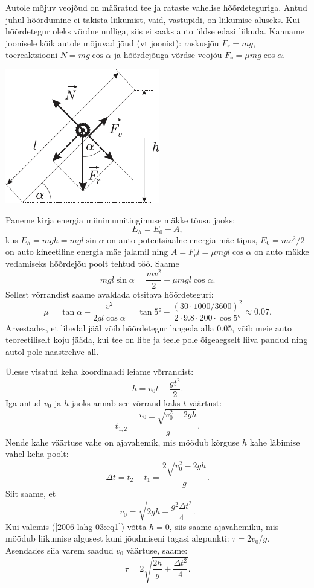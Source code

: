 \documentclass[10pt]{article}
\begin{document}
{%

\solu
Autole mõjuv veojõud on määratud tee ja rataste vahelise hõõrdeteguriga. Antud juhul hõõrdumine ei takista liikumist, vaid, vastupidi, on liikumise aluseks. Kui hõõrdetegur oleks võrdne nulliga, siis ei saaks auto üldse edasi liikuda. Kanname joonisele kõik autole mõjuvad jõud (vt joonist): raskusjõu $F_r = mg$, toereaktsiooni $N = mg \cos \alpha$ ja hõõrdejõuga võrdse veojõu $F_v = \mu mg \cos \alpha$.

\begin{center}
	\includegraphics[width=0.5\linewidth]{2005-lahg-02-lah}
\end{center}

Paneme kirja energia miinimumitingimuse mäkke tõusu jaoks:
\[
E_h = E_0 + A,
\]
kus $E_h = mgh = mgl\sin \alpha$ on auto potentsiaalne energia mäe tipus, $E_0 = mv^2/2$ on auto kineetiline energia mäe jalamil ning $A = F_vl = \mu mgl \cos \alpha$ on auto mäkke vedamiseks hõõrdejõu poolt tehtud töö. Saame
\[
m g l \sin \alpha=\frac{m v^{2}}{2}+\mu m g l \cos \alpha.
\]
Sellest võrrandist saame avaldada otsitava hõõrdeteguri:
\[
\mu=\tan \alpha-\frac{v^{2}}{2 g l \cos \alpha}=\tan \ang{5}-\frac{(\num{30} \cdot \num{1000} / \num{3600})^{2}}{\num{2} \cdot \num{9,8} \cdot \num{200} \cdot \cos \ang{5}} \approx \num{0,07}.
\]
Arvestades, et libedal jääl võib hõõrdetegur langeda alla \num{0,05}, võib meie auto teoreetiliselt koju jääda, kui tee on libe ja teele pole õigeaegselt liiva pandud ning autol pole naastrehve all.
\probend
\bigskip


\solu
Ülesse visatud keha koordinaadi leiame võrrandist: 
\[
h = v_0t - \frac{gt^2}{2}.
\]
Iga antud $v_0$ ja $h$ jaoks annab see võrrand kaks $t$ väärtust:
\[
t_{1,2}=\frac{v_{0} \pm \sqrt{v_{0}^{2}-2 g h}}{g}.
\]
Nende kahe väärtuse vahe on ajavahemik, mis möödub kõrguse $h$ kahe läbimise vahel keha poolt:
\begin{equation} \label{2006-lahg-03:eq1}
\Delta t=t_{2}-t_{1}=\frac{2 \sqrt{v_{0}^{2}-2 g h}}{g}.
\end{equation}
Siit saame, et
\[
v_{0}=\sqrt{2 g h+\frac{g^{2} \Delta t^{2}}{4}}.
\]
Kui valemis (\ref{2006-lahg-03:eq1}) võtta $h = 0$, siis saame ajavahemiku, mis möödub liikumise algusest kuni jõudmiseni tagasi algpunkti: $\tau = 2v_0/g$. Asendades siia varem saadud $v_0$ väärtuse, saame:
\[
\tau=2 \sqrt{\frac{2 h}{g}+\frac{\Delta t^{2}}{4}}.
\]
\probend
\bigskip

}
\end{document}
